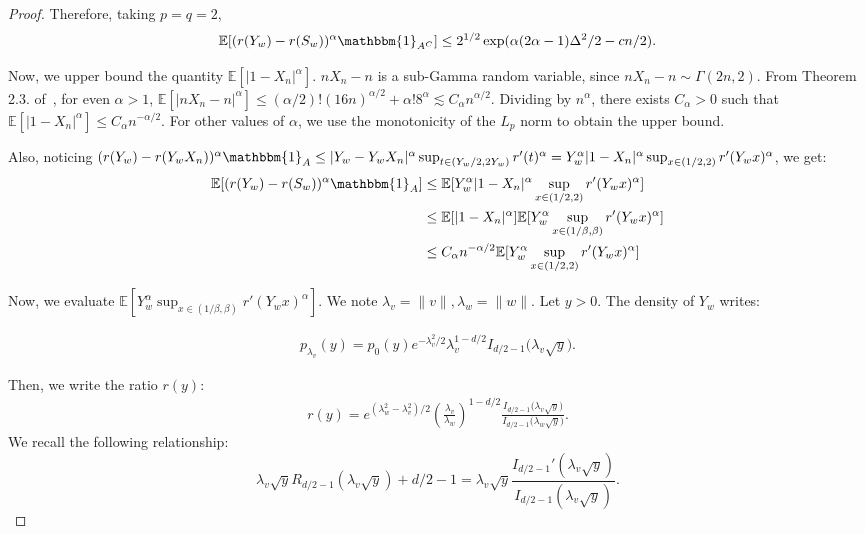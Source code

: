 \documentclass{article}
\theoremstyle{plain}
\theoremstyle{definition}
\theoremstyle{remark}
\begin{document}
\begin{proof}
    Therefore, taking $p=q=2$,
    \[ \mathbb{E}[(r(Y_w) - r(S_w))^\alpha\mathbbm{1}_{A^C}] \leq 2^{1/2}\exp(\alpha(2\alpha - 1) \Delta^2/2-cn/2).\]

    Now, we upper bound the quantity $\mathbb{E}[|1-X_n|^\alpha]$. $nX_n-n$ is a sub-Gamma random variable, since $n X_n - n \sim \Gamma(2n,2)$. From Theorem 2.3. of~\citet{Boucheron2013}, for even $\alpha > 1$, $\mathbb{E}[|n X_n - n|^\alpha] \leq (\alpha/2)! (16n)^{\alpha/2} + \alpha!8^\alpha \lesssim C_\alpha n^{\alpha/2}$.
    Dividing by $n^\alpha$, there exists $C_\alpha > 0$ such that $\mathbb{E}[|1-X_n|^\alpha] \leq C_\alpha n^{-\alpha/2}$. For other values of $\alpha$, we use the monotonicity of the $L_p$ norm to obtain the upper bound.
    
    
    Also, noticing $(r(Y_w) - r(Y_wX_n))^\alpha \mathbbm{1}_{A} \leq |Y_w - Y_wX_n|^\alpha\sup_{t \in (Y_w/2, 2Y_w)} r'(t)^\alpha = Y_w^\alpha|1 - X_n|^\alpha\sup_{x \in (1/2, 2)} r'(Y_w x)^\alpha$, we get:
    \begin{align*}
        \mathbb{E}[(r(Y_w) - r(S_w))^\alpha\mathbbm{1}_{A}]
     &\leq \mathbb{E}[Y_w^\alpha |1-X_n|^\alpha \sup_{x \in (1/2,2)} r'(Y_wx)^\alpha]\\
        &\leq\mathbb{E}[|1-X_n|^\alpha] \mathbb{E}[Y_w^\alpha  \sup_{x \in (1/\beta,\beta)} r'(Y_w x)^\alpha]\\
        &\leq C_\alpha n^{-\alpha/2}\mathbb{E}[Y_w^\alpha \sup_{x \in (1/2,2)} r'(Y_w x)^\alpha]
    \end{align*}

    Now, we evaluate $\mathbb{E}[Y_w^\alpha \sup_{x \in (1/\beta,\beta)} r'(Y_w x)^\alpha]$. We note $\lambda_v = \|v\|, \lambda_w = \|w\|$. Let $y > 0$. The density of $Y_w$ writes:

    \begin{align*}
        p_{\lambda_v}(y) = p_0(y) e^{- \lambda_v^2/2} \lambda_v^{1-d/2}  I_{d/2-1}\big(\lambda_v\sqrt{y}\big).
    \end{align*}

    Then, we write the ratio $r(y)$:
    \begin{align*}
        r(y) = e^{(\lambda_w^2-\lambda_v^2)/2} \left(\frac{\lambda_v}{\lambda_w}\right)^{1-d/2}\frac{I_{d/2-1}\big(\lambda_v\sqrt{y}\big)}{I_{d/2-1}\big(\lambda_w\sqrt{y}\big)}.
    \end{align*}
    We recall the following relationship:
    \[\lambda_v \sqrt{y}R_{d/2-1}(\lambda_v \sqrt{y}) + d/2 - 1= \lambda_v \sqrt{y} \frac{I_{d/2-1}'(\lambda_v \sqrt{y})}{I_{d/2-1}(\lambda_v \sqrt{y})}.\]


\end{proof}
\end{document}
